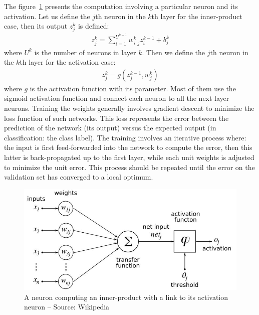 \documentclass[a4paper,12pt]{report}
\begin{document}
The figure~\ref{fig:artificial_neurons} presents the computation involving a particular neuron and its activation.
Let us define the $j$th neuron in the $k$th layer for the inner-product case, then its output $z^k_j$ is defined:
\begin{eqnarray}
    z^k_j = \sum_{i=1}^{U^{k-1}} w^k_{i,j} z^{k-1}_i + b^k_j
\end{eqnarray}
where $U^k$ is the number of neurons in layer $k$.
Then we define the $j$th neuron in the $k$th layer for the activation case:
\begin{eqnarray}
    z^k_j = g(z^{k-1}_j, w^k_{j})
\end{eqnarray}
where $g$ is the activation function with its parameter.
Most of them use the sigmoid activation function and connect each neuron to all the next layer neurons.
Training the weights generally involves gradient descent to minimize the loss function of such networks.
This loss represents the error between the prediction of the network (its output) versus the expected output (in classification: the class label).
The training involves an iterative process where: the input is first feed-forwarded into the network to compute the error, then this latter is back-propagated up to the first layer, while each unit weights is adjusted to minimize the unit error.
This process should be repeated until the error on the validation set has converged to a local optimum.

\begin{figure}[t]
    \begin{center}
        \includegraphics{thesis_figures/800px-ArtificialNeuronModel_english.jpg}
    \end{center}
    \caption{A neuron computing an inner-product with a link to its activation neuron -- Source: Wikipedia}
    \label{fig:artificial_neurons}
\end{figure}
\end{document}
